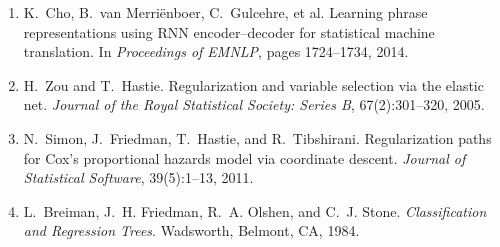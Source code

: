 \documentclass{mnnit}
\begin{document}
\begin{enumerate}
\item\label{ref:gru} K.~Cho, B.~van Merri\"enboer, C.~Gulcehre, et al. Learning phrase representations using RNN encoder--decoder for statistical machine translation. In \emph{Proceedings of EMNLP}, pages 1724--1734, 2014.
\item\label{ref:elasticnet} H.~Zou and T.~Hastie. Regularization and variable selection via the elastic net. \emph{Journal of the Royal Statistical Society: Series B}, 67(2):301--320, 2005.
\item\label{ref:coxnet} N.~Simon, J.~Friedman, T.~Hastie, and R.~Tibshirani. Regularization paths for Cox's proportional hazards model via coordinate descent. \emph{Journal of Statistical Software}, 39(5):1--13, 2011.
\item\label{ref:cart} L.~Breiman, J.~H. Friedman, R.~A. Olshen, and C.~J. Stone. \emph{Classification and Regression Trees}. Wadsworth, Belmont, CA, 1984.
\end{enumerate}
\end{document}
